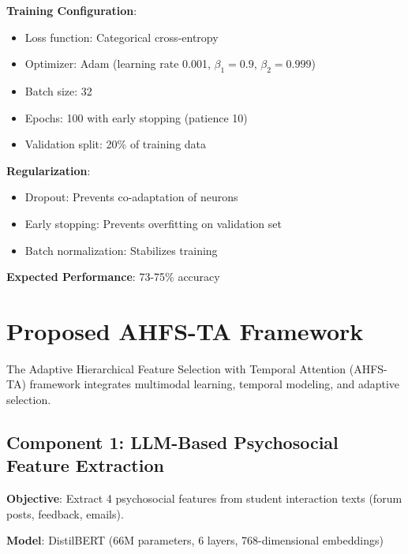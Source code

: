 \textbf{Training Configuration}:
\begin{itemize}
\item Loss function: Categorical cross-entropy
\item Optimizer: Adam (learning rate 0.001, $\beta_1=0.9$, $\beta_2=0.999$)
\item Batch size: 32
\item Epochs: 100 with early stopping (patience 10)
\item Validation split: 20\% of training data
\end{itemize}

\textbf{Regularization}:
\begin{itemize}
\item Dropout: Prevents co-adaptation of neurons
\item Early stopping: Prevents overfitting on validation set
\item Batch normalization: Stabilizes training
\end{itemize}

\textbf{Expected Performance}: 73-75\% accuracy

\section{Proposed AHFS-TA Framework}

The Adaptive Hierarchical Feature Selection with Temporal Attention (AHFS-TA) framework integrates multimodal learning, temporal modeling, and adaptive selection.

\subsection{Component 1: LLM-Based Psychosocial Feature Extraction}

\textbf{Objective}: Extract 4 psychosocial features from student interaction texts (forum posts, feedback, emails).

\textbf{Model}: DistilBERT (66M parameters, 6 layers, 768-dimensional embeddings)

